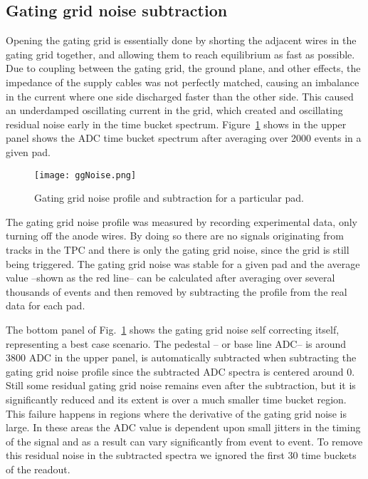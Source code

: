 \subsection{Gating grid noise subtraction}
\label{sec:ggnoisesub}
Opening the gating grid is essentially done by shorting the adjacent wires in the gating grid together, and allowing them to reach equilibrium as fast as possible. Due to coupling between the gating grid, the ground plane, and other effects, the impedance of the supply cables was not perfectly matched, causing an imbalance in the current where one side discharged faster than the other side. This caused an underdamped oscillating current in the grid, which created and  oscillating residual noise early in the time bucket spectrum. Figure~\ref{fig:ggNoiseSub} shows in the upper panel shows the ADC time bucket spectrum after averaging over 2000 events in a given pad. 
 
\begin{figure}[!htb]
\centering
\texttt{[image: ggNoise.png]}
\caption{Gating grid noise profile and subtraction for a particular pad.}
\label{fig:ggNoiseSub}
\end{figure}

The gating grid noise profile was measured by recording experimental data, only turning off the anode wires. By doing so there are no signals originating from tracks in the TPC and there is only the gating grid noise, since the grid is still being triggered. The gating grid noise was stable for a given pad and the average value --shown as the red line-- can be calculated after averaging over several thousands of events and then removed by subtracting the profile from the real data for each pad.

The bottom panel of Fig.~\ref{fig:ggNoiseSub} shows the gating grid noise self correcting itself, representing a best case scenario. The pedestal -- or base line ADC-- is around 3800 ADC in the upper panel, is automatically subtracted when subtracting the gating grid noise profile since the subtracted ADC spectra is centered around 0. Still some residual gating grid noise remains even after the subtraction, but it is significantly reduced and its extent is over a much smaller time bucket region. This failure happens in regions where the derivative of the gating grid noise is large. In these areas the ADC value is dependent upon small jitters in the timing of the signal and as a result can vary significantly from event to event. To remove this residual noise in the subtracted spectra we ignored the first 30 time buckets of the readout.

